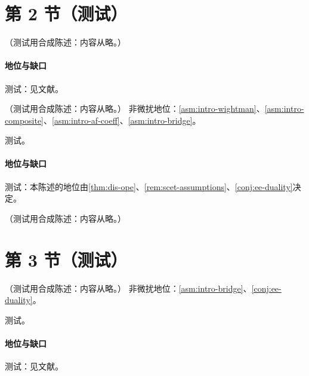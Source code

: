 \section{第 2 节（测试）}\label{sec:heavy-qcdf}

\begin{proposition}\label{prop:heavy-qcdf-endpoint}
（测试用合成陈述：内容从略。）
\end{proposition}
\paragraph{地位与缺口}测试：见文献。

\begin{theorem}\label{thm:heavy-inclusive-b}
（测试用合成陈述：内容从略。）
非微扰地位：\cref{asm:intro-wightman}、\cref{asm:intro-composite}、\cref{asm:intro-af-coeff}、\cref{asm:intro-bridge}。
\end{theorem}
\begin{proofsketch}测试。\end{proofsketch}
\paragraph{地位与缺口}测试：本陈述的地位由\cref{thm:dis-ope}、\cref{rem:scet-assumptions}、\cref{conj:ee-duality}决定。

\begin{definition}\label{def:heavy-nrqcd}
（测试用合成陈述：内容从略。）
\end{definition}

\section{第 3 节（测试）}\label{sec:heavy-inclusive}

\begin{theorem}\label{thm:heavy-nrqcd-decay}
（测试用合成陈述：内容从略。）
非微扰地位：\cref{asm:intro-bridge}、\cref{conj:ee-duality}。
\end{theorem}
\begin{proofsketch}测试。\end{proofsketch}
\paragraph{地位与缺口}测试：见文献。


